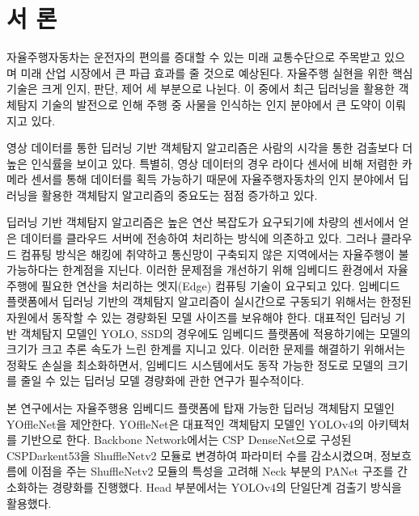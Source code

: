 \documentclass[10pt,twocolumn,letterpaper]{article}
\begin{document}
\section{서 론}
\vspace{.25cm}

자율주행자동차는 운전자의 편의를 증대할 수 있는 미래 교통수단으로 주목받고 있으며 미래 산업 시장에서 큰 파급 효과를 줄 것으로 예상된다. \cite{lee2016rnrsodhl, jeong2017wkdbfwngod} 자율주행 실현을 위한 핵심 기술은 크게 인지, 판단, 제어 세 부분으로 나뉜다. 이 중에서 최근 딥러닝을 활용한 객체탐지 기술의 발전으로 인해 주행 중 사물을 인식하는 인지 분야에서 큰 도약이 이뤄지고 있다.

영상 데이터를 통한 딥러닝 기반 객체탐지 알고리즘은 사람의 시각을 통한 검출보다 더 높은 인식률을 보이고 있다. 특별히, 영상 데이터의 경우 라이다 센서에 비해 저렴한 카메라 센서를 통해 데이터를 획득 가능하기 때문에 자율주행자동차의 인지 분야에서 딥러닝을 활용한 객체탐지 알고리즘의 중요도는 점점 증가하고 있다.

딥러닝 기반 객체탐지 알고리즘은 높은 연산 복잡도가 요구되기에 차량의 센서에서 얻은 데이터를 클라우드 서버에 전송하여 처리하는 방식에 의존하고 있다. 그러나 클라우드 컴퓨팅 방식은 해킹에 취약하고 통신망이 구축되지 않은 지역에서는 자율주행이 불가능하다는 한계점을 지닌다. \cite{ferdowsi2018robust} 이러한 문제점을 개선하기 위해 임베디드 환경에서 자율주행에 필요한 연산을 처리하는 엣지(Edge) 컴퓨팅 기술이 요구되고 있다. \cite{liu2019edge} 임베디드 플랫폼에서 딥러닝 기반의 객체탐지 알고리즘이 실시간으로 구동되기 위해서는 한정된 자원에서 동작할 수 있는 경량화된 모델 사이즈를 보유해야 한다. 대표적인 딥러닝 기반 객체탐지 모델인 YOLO, SSD의 경우에도 임베디드 플랫폼에 적용하기에는 모델의 크기가 크고 추론 속도가 느린 한계를 지니고 있다. 이러한 문제를 해결하기 위해서는 정확도 손실을 최소화하면서, 임베디드 시스템에서도 동작 가능한 정도로 모델의 크기를 줄일 수 있는 딥러닝 모델 경량화에 관한 연구가 필수적이다. \cite{chlwogns2019thgud, rladudwns2020wkdbfwngod, lee2017study, dhtjsxor2020emfhsdml, oh2020frdet, cheng2017survey, lee2019recent, howard2019searching}

본 연구에서는 자율주행용 임베디드 플랫폼에 탑재 가능한 딥러닝 객체탐지 모델인 YOffleNet을 제안한다. YOffleNet은 대표적인 객체탐지 모델인 YOLOv4의 아키텍처를 기반으로 한다. Backbone Network에서는 CSP DenseNet으로 구성된 CSPDarkent53을 ShuffleNetv2 모듈로 변경하여 파라미터 수를 감소시켰으며, 정보흐름에 이점을 주는 ShuffleNetv2 모듈의 특성을 고려해 Neck 부분의 PANet 구조를 간소화하는 경량화를 진행했다. Head 부분에서는 YOLOv4의 단일단계 검출기 방식을 활용했다.
\end{document}
